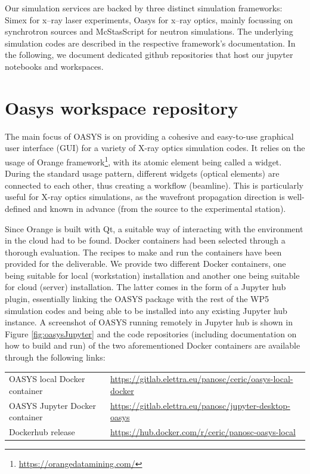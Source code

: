 \documentclass[10pt]{scrartcl}
\begin{document}
Our simulation services are backed by three distinct simulation frameworks:
Simex for x--ray laser experiments, Oasys for x--ray optics, mainly focussing on
synchrotron sources and McStasScript for neutron simulations. The underlying
simulation codes are described in the respective framework's documentation. In
the following, we document dedicated github repositories that host our jupyter
notebooks and workspaces.


\section{Oasys workspace repository}
\label{sec:oasys}
The main focus of OASYS is on providing a cohesive and easy-to-use graphical user interface (GUI) for a variety of X-ray optics simulation codes. It relies on the usage of Orange framework\footnote{\url{https://orangedatamining.com/}}, with its atomic element being called a widget. During the standard usage pattern, different widgets (optical elements) are connected to each other, thus creating a workflow (beamline). This is particularly useful for X-ray optics simulations, as the wavefront propagation direction is well-defined and known in advance (from the source to the experimental station).

Since Orange is built with Qt, a suitable way of interacting with the environment in the cloud had to be found. Docker containers had been selected through a thorough evaluation. The recipes to make and run the containers have been provided for the deliverable. We provide two different Docker containers, one being suitable for local (workstation) installation and another one being suitable for cloud (server) installation. The latter comes in the form of a Jupyter hub plugin, essentially linking the OASYS package with the rest of the WP5 simulation codes and being able to be installed into any existing Jupyter hub instance.  A screenshot of OASYS running remotely in Jupyter hub is shown in Figure \ref{fig:oasysJupyter} and the code repositories (including documentation on how to build and run) of the two aforementioned Docker containers are available through the following links:

\begin{center}
\begin{tabular}{l l}
OASYS local Docker container & \url{https://gitlab.elettra.eu/panosc/ceric/oasys-local-docker} \\
OASYS Jupyter Docker container & \url{https://gitlab.elettra.eu/panosc/jupyter-desktop-oasys} \\
Dockerhub release & \url{https://hub.docker.com/r/ceric/panosc-oasys-local}
\end{tabular}
\end{center}
\end{document}

